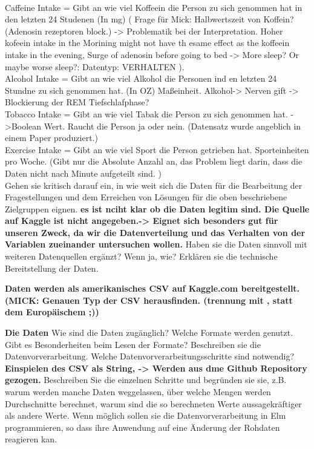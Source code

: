 \documentclass[usegeometry=true]{scrartcl}
\begin{document}
{\\ Caffeine Intake = Gibt an wie viel Koffeein die Person zu sich genommen hat in den letzten 24 Studenen (In mg) ( Frage für Mick: Halbwertszeit von Koffein? (Adenosin rezeptoren block.) -> Problematik bei der Interpretation. Hoher kofeein intake in the Morining might not have th esame effect as the koffeein intake in the evening, Surge of adenosin before going to bed -> More sleep? Or maybe worse sleep?: Datentyp: VERHALTEN ). 
\\ Alcohol Intake = Gibt an wie viel Alkohol die Personen ind en letzten 24 Stundne zu sich genommen hat. (In OZ)  Maßeinheit. Alkohol-> Nerven gift -> Blockierung der REM Tiefschlafphase? 
\\ Tobacco Intake = Gibt an wie viel Tabak die Person zu sich genommen hat. ->Boolean Wert. Raucht die Person ja oder nein. (Datensatz wurde angeblich in einem Paper produziert.)
\\ Exercise Intake = Gibt an wie viel Sport die Person getrieben hat. Sporteinheiten pro Woche. (Gibt nur die Absolute Anzahl an, das Problem liegt darin, dass die Daten nicht nach Minute aufgeteilt sind. ) \\ }
Gehen sie kritisch darauf ein, in wie weit sich die Daten für die Bearbeitung der Fragestellungen und dem Erreichen von Lösungen für die oben beschriebene Zielgruppen eignen.
\textbf{es ist nciht klar ob die Daten legitim sind. Die Quelle auf Kaggle ist nicht angegeben.-> 
Eignet sich besonders gut für unseren Zweck, da wir die Datenverteilung und das Verhalten von der Variablen zueinander untersuchen wollen. }
 Haben sie die Daten sinnvoll mit weiteren Datenquellen ergänzt? Wenn ja, wie?
Erklären sie die technische Bereitstellung der Daten.

\textbf{Daten werden als amerikanisches CSV auf Kaggle.com bereitgestellt. (MICK: Genauen Typ der CSV herausfinden. (trennung mit , statt dem Europäischem ;))}

\textbf{ Die Daten }
Wie sind die Daten zugänglich? Welche Formate werden genutzt. Gibt es Besonderheiten beim Lesen der Formate?
Beschreiben sie die Datenvorverarbeitung.
 Welche Datenvorverarbeitungsschritte sind notwendig?
 \textbf{ Einspielen des CSV als String, -> Werden aus dme Github Repository gezogen.  }
  Beschreiben Sie die einzelnen Schritte und begründen sie sie, z.B. warum werden manche Daten weggelassen, über welche Mengen werden Durchschnitte berechnet, warum sind die so berechneten Werte aussagekräftiger als andere Werte. Wenn möglich sollen sie die Datenvorverarbeitung in Elm programmieren, so dass ihre Anwendung auf eine Änderung der Rohdaten reagieren kan.
 
\end{document}
